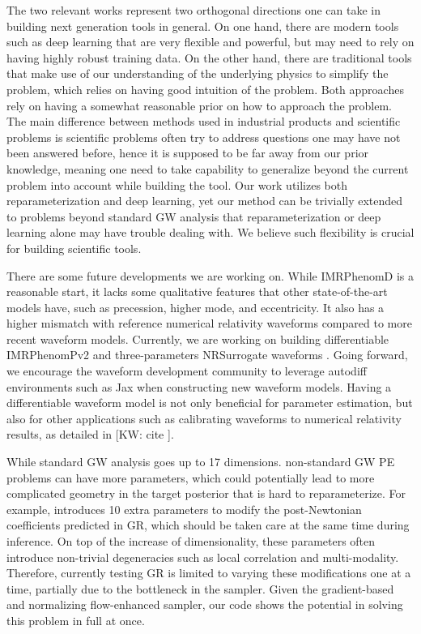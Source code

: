 \documentclass[twocolumn]{aastex631}
\newcommand{\kw}[1]{{\color{rb4}[KW: #1 ]}}
\begin{document}
The two relevant works represent two orthogonal directions one can take in
building next generation tools in general. On one hand, there are modern tools
such as deep learning that are very flexible and powerful, but may need to rely
on having highly robust training data. On the other hand, there are traditional
tools that make use of our understanding of the underlying physics to simplify
the problem, which relies on having good intuition of the problem. Both
approaches rely on having a somewhat reasonable prior on how to approach the
problem. The main difference between methods used in industrial products and
scientific problems is scientific problems often try to address questions one
may have not been answered before, hence it is supposed to be far away from our
prior knowledge, meaning one need to take capability to generalize beyond the
current problem into account while building the tool. Our work utilizes both
reparameterization and deep learning, yet our method can be trivially extended
to problems beyond standard GW analysis that reparameterization or deep learning
alone may have trouble dealing with. We believe such flexibility is crucial for
building scientific tools.

There are some future developments we are working on. While IMRPhenomD
\cite{Khan:2015jqa} is a reasonable start, it lacks some qualitative features
that other state-of-the-art models have, such as precession, higher mode, and
eccentricity. It also has a higher mismatch with reference numerical relativity
waveforms compared to more recent waveform models. Currently, we are working on
building differentiable IMRPhenomPv2 \cite{Khan:2018fmp} and three-parameters
NRSurrogate waveforms \cite{Varma:2018mmi}. Going forward, we encourage the
waveform development community to leverage autodiff environments such as Jax
when constructing new waveform models. Having a differentiable waveform model is
not only beneficial for parameter estimation, but also for other applications
such as calibrating waveforms to numerical relativity results, as detailed in
\kw{cite}.

While standard GW analysis goes up to 17 dimensions. non-standard GW PE problems
can have more parameters, which could potentially lead to more complicated
geometry in the target posterior that is hard to reparameterize. For example,
\cite{LIGOScientific:2021sio} introduces 10 extra parameters to modify the
post-Newtonian coefficients predicted in GR, which should be taken care at the
same time during inference. On top of the increase of dimensionality, these
parameters often introduce non-trivial degeneracies such as local correlation
and multi-modality. Therefore, currently testing GR is limited to varying these
modifications one at a time, partially due to the bottleneck in the sampler.
Given the gradient-based and normalizing flow-enhanced sampler, our code shows
the potential in solving this problem in full at once.
\end{document}

